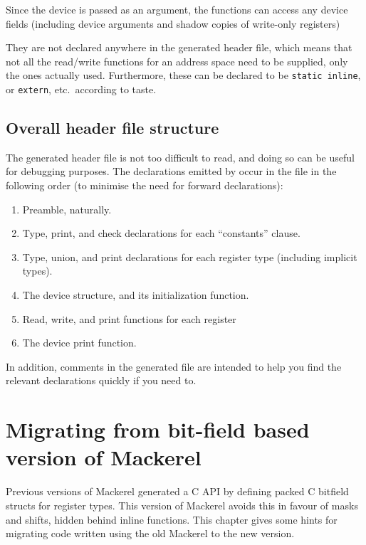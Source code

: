 \documentclass[a4paper,11pt,twoside]{report}
\begin{document}
Since the device is passed as an argument, the functions can access
any device fields (including device arguments and shadow copies of
write-only registers) 

They are not
declared anywhere in the generated header file, which means that not
all the read/write functions for an 
address space need to be supplied, only the ones actually used.
Furthermore, these can be declared to be \texttt{static inline}, or
\texttt{extern}, etc.\ according to taste.

\section{Overall header file structure}

The generated header file is not too difficult to read, and doing so
can be useful for debugging purposes.  The declarations emitted by
\Mac occur in the file in the following order (to minimise the need
for forward declarations):

\begin{enumerate}
\item Preamble, naturally.
\item Type, print, and check declarations for each ``constants''
  clause.
\item Type, union, and print declarations for each register type
  (including implicit types). 
\item The device structure, and its initialization function.
\item Read, write, and print functions for each register
\item The device print function. 
\end{enumerate}

In addition, comments in the generated file are intended to help you
find the relevant declarations quickly if you need to. 

\chapter{Migrating from bit-field based version of Mackerel}\label{chap:migrating}

Previous versions of Mackerel generated a C API by defining packed C
bitfield structs for register types.  This version of Mackerel avoids
this in favour of masks and shifts, hidden behind inline functions.
This chapter gives some hints for migrating code written using the old
Mackerel to the new version. 
\end{document}
